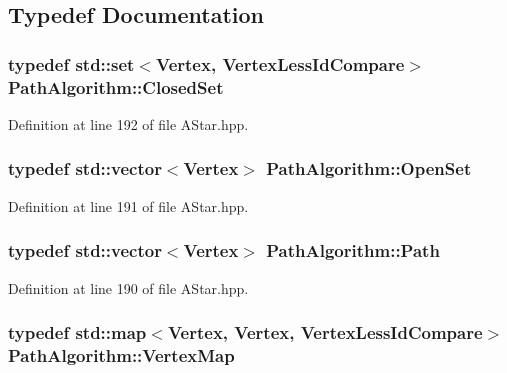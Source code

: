 \subsection{Typedef Documentation}
\subsubsection[{\texorpdfstring{Closed\+Set}{ClosedSet}}]{\setlength{\rightskip}{0pt plus 5cm}typedef std\+::set$<${\bf Vertex}, {\bf Vertex\+Less\+Id\+Compare}$>$ {\bf Path\+Algorithm\+::\+Closed\+Set}}\hypertarget{namespace_path_algorithm_ac027c23e4b4c237b6eb96fc63d79266f}{}\label{namespace_path_algorithm_ac027c23e4b4c237b6eb96fc63d79266f}


Definition at line 192 of file A\+Star.\+hpp.

\subsubsection[{\texorpdfstring{Open\+Set}{OpenSet}}]{\setlength{\rightskip}{0pt plus 5cm}typedef std\+::vector$<${\bf Vertex}$>$ {\bf Path\+Algorithm\+::\+Open\+Set}}\hypertarget{namespace_path_algorithm_a999fc5baea7d1f71e42570630a297029}{}\label{namespace_path_algorithm_a999fc5baea7d1f71e42570630a297029}


Definition at line 191 of file A\+Star.\+hpp.

\subsubsection[{\texorpdfstring{Path}{Path}}]{\setlength{\rightskip}{0pt plus 5cm}typedef std\+::vector$<${\bf Vertex}$>$ {\bf Path\+Algorithm\+::\+Path}}\hypertarget{namespace_path_algorithm_a7f2958a43117506f3cb6dc9409a22c0d}{}\label{namespace_path_algorithm_a7f2958a43117506f3cb6dc9409a22c0d}


Definition at line 190 of file A\+Star.\+hpp.

\subsubsection[{\texorpdfstring{Vertex\+Map}{VertexMap}}]{\setlength{\rightskip}{0pt plus 5cm}typedef std\+::map$<${\bf Vertex}, {\bf Vertex}, {\bf Vertex\+Less\+Id\+Compare}$>$ {\bf Path\+Algorithm\+::\+Vertex\+Map}}\hypertarget{namespace_path_algorithm_ac8a52a9740a0bfa959810bd92e08d962}{}\label{namespace_path_algorithm_ac8a52a9740a0bfa959810bd92e08d962}


